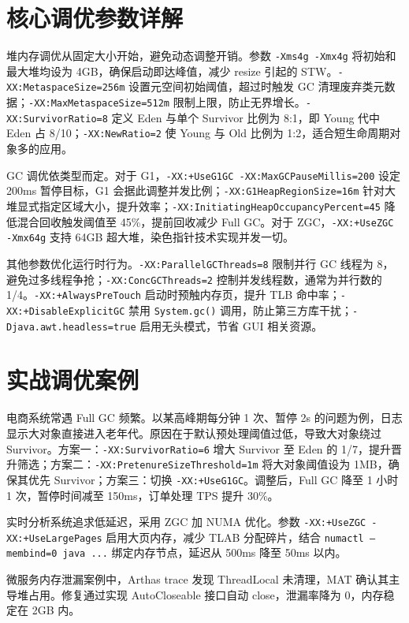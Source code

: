 \chapter{核心调优参数详解}
堆内存调优从固定大小开始，避免动态调整开销。参数 \texttt{-Xms4g -Xmx4g} 将初始和最大堆均设为 4GB，确保启动即达峰值，减少 resize 引起的 STW。\texttt{-XX:MetaspaceSize=256m} 设置元空间初始阈值，超过时触发 GC 清理废弃类元数据；\texttt{-XX:MaxMetaspaceSize=512m} 限制上限，防止无界增长。\texttt{-XX:SurvivorRatio=8} 定义 Eden 与单个 Survivor 比例为 8:1，即 Young 代中 Eden 占 8/10；\texttt{-XX:NewRatio=2} 使 Young 与 Old 比例为 1:2，适合短生命周期对象多的应用。\par
GC 调优依类型而定。对于 G1，\texttt{-XX:+UseG1GC -XX:MaxGCPauseMillis=200} 设定 200ms 暂停目标，G1 会据此调整并发比例；\texttt{-XX:G1HeapRegionSize=16m} 针对大堆显式指定区域大小，提升效率；\texttt{-XX:InitiatingHeapOccupancyPercent=45} 降低混合回收触发阈值至 45\%{}，提前回收减少 Full GC。对于 ZGC，\texttt{-XX:+UseZGC -Xmx64g} 支持 64GB 超大堆，染色指针技术实现并发一切。\par
其他参数优化运行时行为。\texttt{-XX:ParallelGCThreads=8} 限制并行 GC 线程为 8，避免过多线程争抢；\texttt{-XX:ConcGCThreads=2} 控制并发线程数，通常为并行数的 1/4。\texttt{-XX:+AlwaysPreTouch} 启动时预触内存页，提升 TLB 命中率；\texttt{-XX:+DisableExplicitGC} 禁用 \texttt{System.gc()} 调用，防止第三方库干扰；\texttt{-Djava.awt.headless=true} 启用无头模式，节省 GUI 相关资源。\par
\chapter{实战调优案例}
电商系统常遇 Full GC 频繁。以某高峰期每分钟 1 次、暂停 2s 的问题为例，日志显示大对象直接进入老年代。原因在于默认预处理阈值过低，导致大对象绕过 Survivor。方案一：\texttt{-XX:SurvivorRatio=6} 增大 Survivor 至 Eden 的 1/7，提升晋升筛选；方案二：\texttt{-XX:PretenureSizeThreshold=1m} 将大对象阈值设为 1MB，确保其优先 Survivor；方案三：切换 \texttt{-XX:+UseG1GC}。调整后，Full GC 降至 1 小时 1 次，暂停时间减至 150ms，订单处理 TPS 提升 30\%{}。\par
实时分析系统追求低延迟，采用 ZGC 加 NUMA 优化。参数 \texttt{-XX:+UseZGC -XX:+UseLargePages} 启用大页内存，减少 TLAB 分配碎片，结合 \texttt{numactl --membind=0 java ...} 绑定内存节点，延迟从 500ms 降至 50ms 以内。\par
微服务内存泄漏案例中，Arthas trace 发现 ThreadLocal 未清理，MAT 确认其主导堆占用。修复通过实现 AutoCloseable 接口自动 close，泄漏率降为 0，内存稳定在 2GB 内。\par
